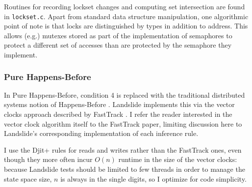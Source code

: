 Routines for recording lockset changes and computing set intersection are found in {\tt lockset.c}.
Apart from standard data structure manipulation,
one algorithmic point of note is that locks are distinguished by types in addition to address.
This allows (e.g.) mutexes stored as part of the implementation of semaphores to protect a different set of accesses than are protected by the semaphore they implement.


\subsubsection{Pure Happens-Before}
\label{sec:landslide-phb}

In Pure Happens-Before,
condition 4 is replaced with the traditional distributed systems notion of Happens-Before \cite{lamport-clocks}.
Landslide implements this via the vector clocks approach described by {\sc FastTrack} \cite{fasttrack}.
I refer the reader interested in the vector clock algorithm itself to the {\sc FastTrack} paper,
limiting discussion here to Landslide's corresponding implementation of each inference rule.

I use the {\sc Djit+} rules for reads and writes rather than the {\sc FastTrack} ones,
even though they more often incur $O(n)$ runtime in the size of the vector clocks:
because Landslide tests should be limited to few threads in order to manage the state space size,
$n$ is always in the single digits, so I optimize for code simplicity.

